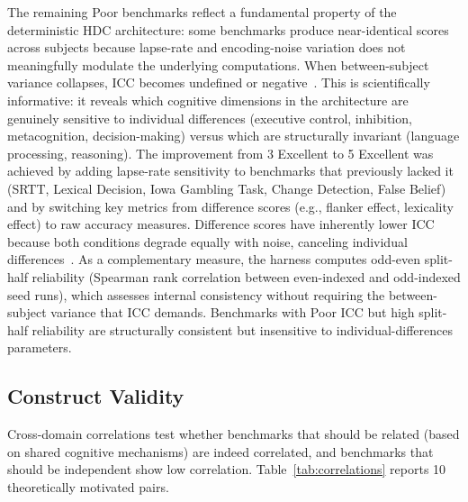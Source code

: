 \documentclass[11pt,letterpaper]{article}
\begin{document}
The remaining Poor benchmarks reflect a fundamental property of the deterministic HDC architecture: some benchmarks produce near-identical scores across subjects because lapse-rate and encoding-noise variation does not meaningfully modulate the underlying computations. When between-subject variance collapses, ICC becomes undefined or negative~\citep{shrout1979intraclass}. This is scientifically informative: it reveals which cognitive dimensions in the architecture are genuinely sensitive to individual differences (executive control, inhibition, metacognition, decision-making) versus which are structurally invariant (language processing, reasoning). The improvement from 3 Excellent to 5 Excellent was achieved by adding lapse-rate sensitivity to benchmarks that previously lacked it (SRTT, Lexical Decision, Iowa Gambling Task, Change Detection, False Belief) and by switching key metrics from difference scores (e.g., flanker effect, lexicality effect) to raw accuracy measures. Difference scores have inherently lower ICC because both conditions degrade equally with noise, canceling individual differences~\citep{cronbach1970essentials}. As a complementary measure, the harness computes odd-even split-half reliability (Spearman rank correlation between even-indexed and odd-indexed seed runs), which assesses internal consistency without requiring the between-subject variance that ICC demands. Benchmarks with Poor ICC but high split-half reliability are structurally consistent but insensitive to individual-differences parameters.

\subsection{Construct Validity}

Cross-domain correlations test whether benchmarks that should be related (based on shared cognitive mechanisms) are indeed correlated, and benchmarks that should be independent show low correlation. Table~\ref{tab:correlations} reports 10 theoretically motivated pairs.
\end{document}
